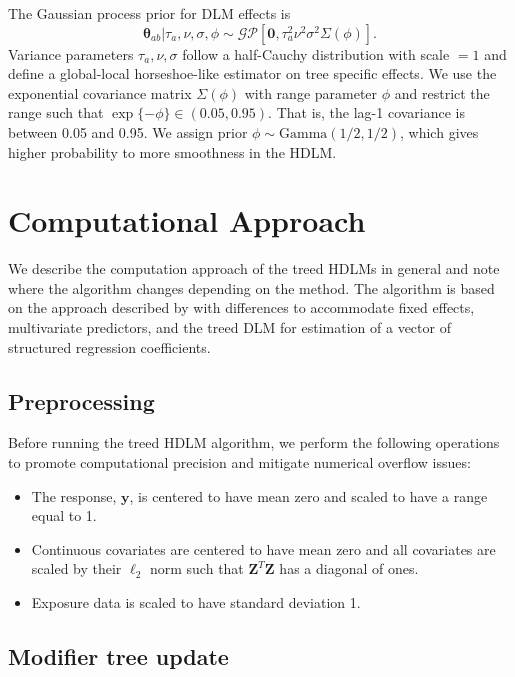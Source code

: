 \documentclass[12pt]{article}
\begin{document}
The Gaussian process prior for DLM effects is
\begin{equation}
    \boldsymbol\theta_{ab}|\tau_a,\nu,\sigma,\phi\sim\mathcal{GP}[\mathbf{0},\tau_a^2\nu^2\sigma^2\Sigma(\phi)].
\end{equation}
Variance parameters $\tau_a,\nu,\sigma$ follow a half-Cauchy distribution with scale $=1$ and define a global-local horseshoe-like estimator on tree specific effects. We use the exponential covariance matrix $\Sigma(\phi)$ with range parameter $\phi$ and restrict the range such that $\exp\{-\phi\}\in(0.05,0.95)$. That is, the lag-1 covariance is between 0.05 and 0.95. We assign prior $\phi\sim\text{Gamma}(1/2,1/2)$, which gives higher probability to more smoothness in the HDLM.




\section{Computational Approach} 
We describe the computation approach of the treed HDLMs in general and note where the algorithm changes depending on the method. The algorithm is based on the approach described by \citep{Chipman2012} with differences to accommodate fixed effects, multivariate predictors, and the treed DLM for estimation of a vector of structured regression coefficients.

\subsection{Preprocessing}
Before running the treed HDLM algorithm, we perform the following operations to promote computational precision and mitigate numerical overflow issues:
\begin{itemize}
    \item The response, $\mathbf{y}$, is centered to have mean zero and scaled to have a range equal to 1.
    \item Continuous covariates are centered to have mean zero and all covariates are scaled by their $\ell_2$ norm such that $\mathbf{Z}^T\mathbf{Z}$ has a diagonal of ones.
    \item Exposure data is scaled to have standard deviation 1.
\end{itemize}


\subsection{Modifier tree update}
\end{document}
